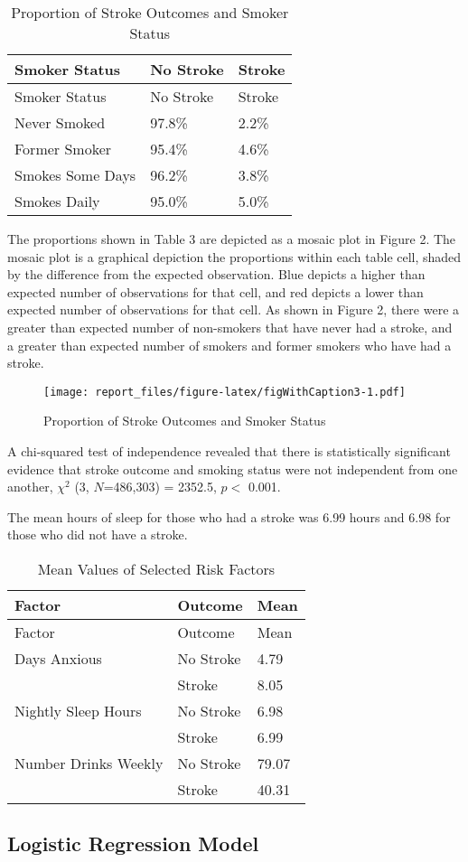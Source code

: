 \documentclass[11pt,]{article}
\begin{document}
\begin{longtable}[]{@{}lll@{}}
\caption{Proportion of Stroke Outcomes and Smoker Status}\tabularnewline
\toprule
Smoker Status & No Stroke & Stroke\tabularnewline
\midrule
\endfirsthead
\toprule
Smoker Status & No Stroke & Stroke\tabularnewline
\midrule
\endhead
Never Smoked & 97.8\% & 2.2\%\tabularnewline
Former Smoker & 95.4\% & 4.6\%\tabularnewline
Smokes Some Days & 96.2\% & 3.8\%\tabularnewline
Smokes Daily & 95.0\% & 5.0\%\tabularnewline
\bottomrule
\end{longtable}

The proportions shown in Table 3 are depicted as a mosaic plot in Figure
2. The mosaic plot is a graphical depiction the proportions within each
table cell, shaded by the difference from the expected observation. Blue
depicts a higher than expected number of observations for that cell, and
red depicts a lower than expected number of observations for that cell.
As shown in Figure 2, there were a greater than expected number of
non-smokers that have never had a stroke, and a greater than expected
number of smokers and former smokers who have had a stroke.

\begin{figure}
\centering
\texttt{[image: report\_files/figure-latex/figWithCaption3-1.pdf]}
\caption{Proportion of Stroke Outcomes and Smoker Status}
\end{figure}

A chi-squared test of independence revealed that there is statistically
significant evidence that stroke outcome and smoking status were not
independent from one another, \(\chi^2\) (3, \(N\)=486,303) = 2352.5,
\(p <\) 0.001.

The mean hours of sleep for those who had a stroke was 6.99 hours and
6.98 for those who did not have a stroke.

\begin{longtable}[]{@{}lll@{}}
\caption{Mean Values of Selected Risk Factors}\tabularnewline
\toprule
Factor & Outcome & Mean\tabularnewline
\midrule
\endfirsthead
\toprule
Factor & Outcome & Mean\tabularnewline
\midrule
\endhead
Days Anxious & No Stroke & 4.79\tabularnewline
& Stroke & 8.05\tabularnewline
Nightly Sleep Hours & No Stroke & 6.98\tabularnewline
& Stroke & 6.99\tabularnewline
Number Drinks Weekly & No Stroke & 79.07\tabularnewline
& Stroke & 40.31\tabularnewline
\bottomrule
\end{longtable}

\hypertarget{logistic-regression-model-1}{%
\subsection{Logistic Regression
Model}\label{logistic-regression-model-1}}
\end{document}
